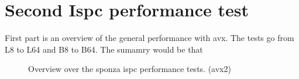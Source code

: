 
\section{Second Ispc performance test}

First part is an overview of the general performance with avx. The tests go from L8 to L64 and B8 to B64. The sumamry would be that 

\iftrue
\begin{figure}[!htb]
	\begin{minipage}[t]{0.4\textwidth} 
	\end{minipage}\hfil \hfil
	\begin{minipage}[t]{0.4\textwidth}
	\end{minipage}
	
	\caption{Overview over the sponza ispc performance tests. (avx2)}
\end{figure}
\newpage
\fi


